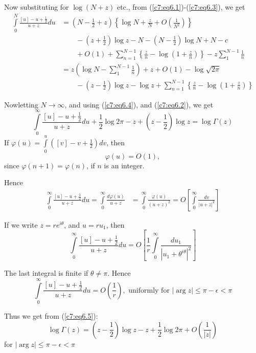 Now substituting for $\log (N+z)$ etc., from (\ref{c7:eq6.1})-(\ref{c7:eq6.3}), we get
\begin{align*}
\int\limits^{N}_0 \frac{[u] - u + \frac{1}{2}}{u + z} du & = \left(N - 
\frac{1}{2} + z\right) \left\{\log N + \frac{z}{N} + O \left(\frac{1}{N^2}
  \right) \right\}\\
&\qquad  - \left(z+\frac{1}{2} \right)\log z - N- \left(N - \frac{1}{2} \right) \log N + N - c\\
&\qquad + O(1) +\sum\limits^{N-1}_{n=1} \left\{\frac{z}{n} - \log
  \left(1+\frac{z}{n} \right) \right\} -z \sum\limits^{N-1}_1
  \frac{1}{n} \\
& = z \left(\log N - \sum\limits^{N-1}_1 \frac{1}{n} \right)  + z  +
  O(1) - \log \sqrt{2\pi}\\
& \qquad - \left(z-\frac{1}{2} \right) \log z - \log z + \sum\limits^{N-1}_{n=1}
  \left\{\frac{z}{n} - \log \left(1+\frac{z}{n} \right) \right\}
\end{align*}

Now\pageoriginale letting $N \to \infty$, and using (\ref{c7:eq6.4}), and (\ref{c7:eq6.2}), we get  
\begin{equation*}
\int\limits^\infty_0 \frac{[u] - u + \frac{1}{2}}{u+z} du +
\frac{1}{2} \log 2 \pi - z + \left(z - \frac{1}{2} \right) \log z = \log \Gamma
(z)\tag{6.5}\label{c7:eq6.5}
\end{equation*}
If $\varphi (u) = \int\limits^u_0 \left([v] - v + \frac{1}{2}\right)dv$, then
$$
\varphi (u) = O(1), 
$$
since $\varphi(n+1) = \varphi (n)$, if $n$ is an integer.

\eject

Hence
\begin{align*}
\int\limits^\infty_0 \frac{[u] - u + \frac{1}{2}}{u+z} du =
\int\limits^\infty_0 \frac{d\varphi(u)}{u+z} & = \int\limits^\infty_0
\frac{\varphi(u)}{(u+z)^2}
 = O \left[ \int\limits^\infty_0 \frac{dv}{|u+z|^2}\right]
\end{align*}

If we write $z = re^{i\theta}$, and $u = ru_1$, then
$$
\int\limits^\infty_0 \frac{[u]-u + \frac{1}{2}}{u+z} du = O
\left[\frac{1}{r} \int\limits^\infty_0
  \frac{du_1}{|u_1+\theta^{i\theta}|^2}\right]  
$$

The last integral is finite if $\theta \neq \pi$. Hence
$$
\int\limits^\infty_0 \frac{[u] - u + \frac{1}{2}}{u+z} du = O
\left(\frac{1}{r} \right), \text{ uniformly for } |\arg z | \leq \pi -
\epsilon < \pi 
$$

Thus we get from (\ref{c7:eq6.5}): 
$$
\log \Gamma (z) = \left(z -\frac{1}{2} \right) \log z -z  + \frac{1}{2} \log 2 \pi
+ O \left( \frac{1}{|z|}\right)
$$
for $|\arg z| \leq \pi - \epsilon < \pi$


